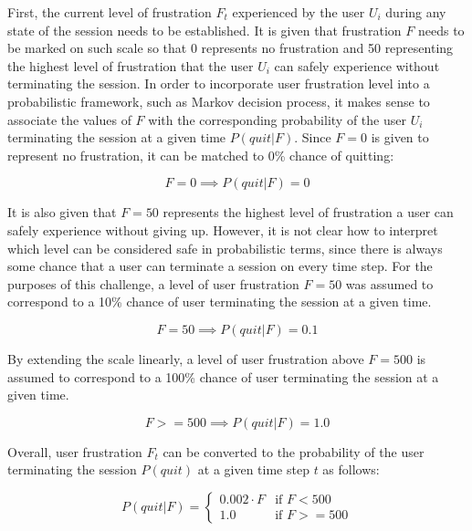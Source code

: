 First, the current level of frustration $F_t$ experienced by the user $U_i$ during any state of the session needs to be established.
It is given that frustration $F$ needs to be marked on such scale so that 0 represents no frustration and 50 representing the highest level of frustration that the user $U_i$ can safely experience without terminating the session.
In order to incorporate user frustration level into a probabilistic framework, such as Markov decision process, it makes sense to associate the values of $F$ with the corresponding probability of the user $U_i$ terminating the session at a given time $P(quit|F)$.
Since $F=0$ is given to represent no frustration, it can be matched to 0\% chance of quitting:

\begin{equation}
    F = 0 \implies P(quit|F) = 0
\end{equation}

It is also given that $F=50$ represents the highest level of frustration a user can safely experience without giving up.
However, it is not clear how to interpret which level can be considered safe in probabilistic terms, since there is always some chance that a user can terminate a session on every time step.
For the purposes of this challenge, a level of user frustration $F=50$ was assumed to correspond to a 10\% chance of user terminating the session at a given time.

\begin{equation}
    F = 50 \implies P(quit|F) = 0.1
\end{equation}

By extending the scale linearly, a level of user frustration above $F=500$ is assumed to correspond to a 100\% chance of user terminating the session at a given time.

\begin{equation}
    F >= 500 \implies P(quit|F) = 1.0
\end{equation}

Overall, user frustration $F_t$ can be converted to the probability of the user terminating the session $P(quit)$ at a given time step $t$ as follows:

\begin{equation} \label{eq:frustration}
    P(quit|F) =
    \begin{cases}
        0.002 \cdot F & \text{if } F < 500 \\
        1.0 & \text{if } F >= 500
    \end{cases}
\end{equation}

